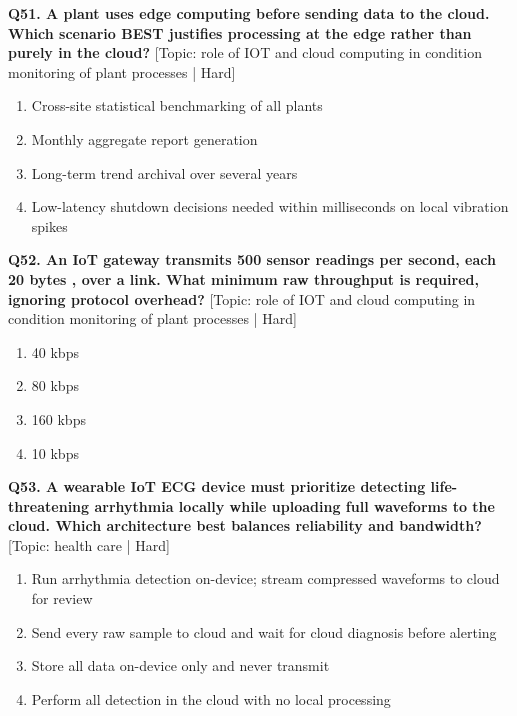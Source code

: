 \noindent\textbf{Q51. A plant uses edge computing before sending data to the cloud. Which scenario BEST justifies processing at the edge rather than purely in the cloud?} \hfill [Topic: role of IOT and cloud computing in condition monitoring of plant processes | Hard]
\begin{enumerate}[label=(\alph*),topsep=2pt,itemsep=1pt,partopsep=0pt,parsep=0pt]
    \item {Cross-site statistical benchmarking of all plants}
    \item {Monthly aggregate report generation}
    \item {Long-term trend archival over several years}
    \item {Low-latency shutdown decisions needed within milliseconds on local vibration spikes}
\end{enumerate}
\vspace{2mm}

\noindent\textbf{Q52. An IoT gateway transmits 500 sensor readings per second, each 20 bytes , over a link. What minimum raw throughput is required, ignoring protocol overhead?} \hfill [Topic: role of IOT and cloud computing in condition monitoring of plant processes | Hard]
\begin{enumerate}[label=(\alph*),topsep=2pt,itemsep=1pt,partopsep=0pt,parsep=0pt]
    \item {40 kbps}
    \item {80 kbps}
    \item {160 kbps}
    \item {10 kbps}
\end{enumerate}
\vspace{2mm}

\noindent\textbf{Q53. A wearable IoT ECG device must prioritize detecting life-threatening arrhythmia locally while uploading full waveforms to the cloud. Which architecture best balances reliability and bandwidth?} \hfill [Topic: health care | Hard]
\begin{enumerate}[label=(\alph*),topsep=2pt,itemsep=1pt,partopsep=0pt,parsep=0pt]
    \item {Run arrhythmia detection on-device; stream compressed waveforms to cloud for review}
    \item {Send every raw sample to cloud and wait for cloud diagnosis before alerting}
    \item {Store all data on-device only and never transmit}
    \item {Perform all detection in the cloud with no local processing}
\end{enumerate}
\vspace{2mm}

